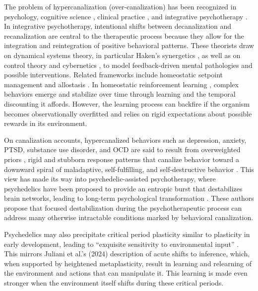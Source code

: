 \documentclass[12pt,fleqn]{article}
\begin{document}
The problem of hypercanalization (over-canalization) has been recognized in psychology, cognitive science \cite{lloyd_understanding_2023}, clinical practice \cite{addicott_primer_2017}, and integrative psychotherapy \cite{schiepek_self-organization_2014, schiepek_integrative_2015, schiepek_psychotherapy_2017}. In integrative psychotherapy, intentional shifts between decanalization and recanalization are central to the therapeutic process because they allow for the integration and reintegration of positive behavioral patterns. These theorists draw on dynamical systems theory, in particular Haken's synergetics \cite{haken_synergetics_1977}, as well as on control theory and cybernetics \cite{wiener_cybernetics_2019}, to model feedback-driven mental pathologies and possible interventions. Related frameworks include homeostatic setpoint management and allostasis \cite{sterling_allostasis_1988, sterling_allostasis_2012}. In homeostatic reinforcement learning \cite{keramati_homeostatic_2014}, complex behaviors emerge and stabilize over time through learning and the temporal discounting it affords. However, the learning process can backfire if the organism becomes observationally overfitted and relies on rigid expectations about possible rewards in its environment.

On canalization accounts, hypercanalized behaviors such as depression, anxiety, PTSD, substance use disorder, and OCD are said to result from overweighted priors \cite{carhart-harris_canalization_2023}, rigid and stubborn response patterns that canalize behavior toward a downward spiral of maladaptive, self-fulfilling, and self-destructive behavior \cite{scheffer_dynamical_2024}. This view has made its way into psychedelic-assisted psychotherapy, where psychedelics have been proposed to provide an entropic burst that destabilizes brain networks, leading to long-term psychological transformation \cite{carhart-harris_entropic_2014, hipolito_pattern_2023, girn_complex_2023}. These authors propose that focused destabilization during the psychotherapeutic process can address many otherwise intractable conditions marked by behavioral canalization.

Psychedelics may also precipitate critical period plasticity similar to plasticity in early development, leading to ``exquisite sensitivity to environmental input'' \cite[Abstract]{lepow_critical_2021}. This mirrors Juliani et al.'s (2024) description of acute shifts to inference, which, when supported by heightened metaplasticity, result in learning and relearning of the environment and actions that can manipulate it. This learning is made even stronger when the environment itself shifts during these critical periods.
\end{document}
